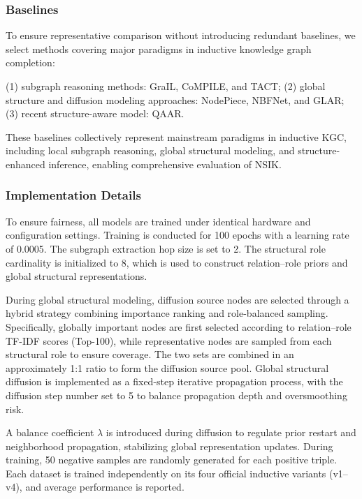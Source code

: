 \documentclass[preprint,12pt]{elsarticle}
\begin{document}
\subsubsection{Baselines}

To ensure representative comparison without introducing redundant baselines, we select methods covering major paradigms in inductive knowledge graph completion:

(1) subgraph reasoning methods: GraIL, CoMPILE, and TACT;  
(2) global structure and diffusion modeling approaches: NodePiece, NBFNet, and GLAR;  
(3) recent structure-aware model: QAAR.

These baselines collectively represent mainstream paradigms in inductive KGC, including local subgraph reasoning, global structural modeling, and structure-enhanced inference, enabling comprehensive evaluation of NSIK.

\subsubsection{Implementation Details}

To ensure fairness, all models are trained under identical hardware and configuration settings. Training is conducted for 100 epochs with a learning rate of 0.0005. The subgraph extraction hop size is set to 2. The structural role cardinality is initialized to 8, which is used to construct relation--role priors and global structural representations.

During global structural modeling, diffusion source nodes are selected through a hybrid strategy combining importance ranking and role-balanced sampling. Specifically, globally important nodes are first selected according to relation--role TF-IDF scores (Top-100), while representative nodes are sampled from each structural role to ensure coverage. The two sets are combined in an approximately 1:1 ratio to form the diffusion source pool. Global structural diffusion is implemented as a fixed-step iterative propagation process, with the diffusion step number set to 5 to balance propagation depth and oversmoothing risk.

A balance coefficient $\lambda$ is introduced during diffusion to regulate prior restart and neighborhood propagation, stabilizing global representation updates. During training, 50 negative samples are randomly generated for each positive triple. Each dataset is trained independently on its four official inductive variants (v1--v4), and average performance is reported.
\end{document}
